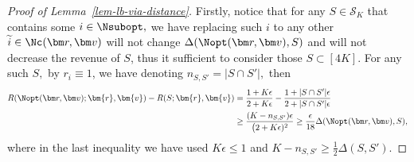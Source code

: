 \documentclass[10pt, letterpaper]{article}
\begin{document}
\begin{proof}[Proof of Lemma~\ref{lem-lb-via-distance}]

Firstly, notice that for any $S \in \mathcal{S}_K$ that contains some $i\in \Nsubopt,$ we have replacing 
such $i$ to any other $\widetilde{i} \in \Nc(\bm r, \bm v)$ will not change $\Delta(\Nopt(\bm r, \bm v),S)$ and will not decrease the revenue of $S$, thus it sufficient to consider those $S\subset [4K].$ For any such $S,$ by $r_i \equiv 1$, we have denoting $n_{S,S'} =\lvert S\cap S' \rvert, $ then
\begin{align*}
R(\Nopt(\bm r, \bm v);\bm{r}, \bm{v}) - R(S;\bm{r}, \bm{v}) &= \frac{1+K\epsilon}{2 +K\epsilon} - \frac{1 + \lvert S\cap S' \rvert \epsilon}{2 + \lvert S \cap S'\rvert \epsilon}\\
&\geq \frac{(K - n_{S,S'})\epsilon}{\big(2+K\epsilon)^2}\geq \frac{\epsilon}{18}\Delta(\Nopt(\bm r, \bm v), S),
\end{align*}
where in the last inequality we have used $K\epsilon\leq 1$ and $K-n_{S,S'} \geq \frac{1}{2}\Delta(S,S' )$.
\end{proof}
\end{document}
